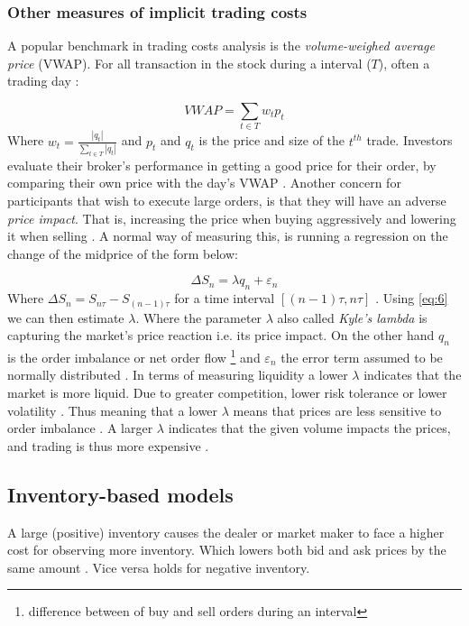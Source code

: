 \documentclass{kththesis}
\theoremstyle{definition}
\begin{document}
\subsubsection*{Other measures of implicit trading costs}
A popular benchmark in trading costs analysis is the \textit{volume-weighed average price} (VWAP). For all transaction in the stock during a interval ($T$), often a trading day \parencite{foucault2013market}:

\begin{equation}
    \label{eq:5}
    VWAP = \sum_{t\in T}{w_t p_t}
\end{equation}
Where $w_t = \frac{|q_t|}{\sum_{t\in T}{|q_t|}}$ and $p_t$ and $q_t$ is the price and size of the $t^{th}$ trade. Investors evaluate their broker's performance in getting a good price for their order, by comparing their own price with the day's VWAP \parencite{foucault2013market}. Another concern for participants that wish to execute large orders, is that they will have an adverse \textit{price impact}. That is, increasing the price when buying aggressively and lowering it when selling \parencite{cartea2015algorithmic, bouchaud2018trades}. A normal way of measuring this, is running a regression on the change of the midprice of the form below:

\begin{equation}
    \label{eq:6}
    \Delta S_n = \lambda q_n + \varepsilon_n
\end{equation}
Where $\Delta S_n = S_{n\tau}-S_{(n-1)\tau}$ for a time interval $[(n-1)\tau, n\tau]$ \parencite{cartea2015algorithmic}. Using \autoref{eq:6} we can then estimate $\lambda$. Where the parameter $\lambda$ also called \textit{Kyle's lambda} \parencite{bouchaud2018trades} is capturing the market's price reaction i.e. its price impact. On the other hand $q_n$ is the order imbalance or net order flow \footnote{difference between of buy and sell orders during an interval} and  $\varepsilon_n$ the error term assumed to be normally distributed \parencite{cartea2015algorithmic, foucault2013market}. In terms of measuring liquidity a lower $\lambda$ indicates that the market is more liquid. Due to greater competition, lower risk tolerance or lower volatility \parencite{cartea2015algorithmic}. Thus meaning that a lower $\lambda$ means that prices are less sensitive to order imbalance \parencite{foucault2013market}.  A larger $\lambda$ indicates that the given volume impacts the prices, and trading is thus more expensive \parencite{bouchaud2018trades}.

\subsection{Inventory-based models}
A large (positive) inventory causes the dealer or market maker to face a higher cost for observing more inventory. Which lowers both bid and ask prices by the same amount \parencite{o1995market}. Vice versa holds for negative inventory. 
\end{document}
